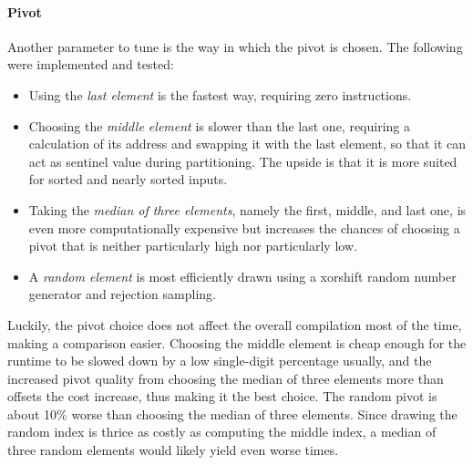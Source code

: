 \paragraph{Pivot}
Another parameter to tune is the way in which the pivot is chosen.
The following were implemented and tested:
\begin{itemize}
	\item
	Using the \emph{last element} is the fastest way, requiring zero instructions.

	\item
	Choosing the \emph{middle element} is slower than the last one, requiring a calculation of its address and swapping it with the last element, so that it can act as sentinel value during partitioning.
	The upside is that it is more suited for sorted and nearly sorted inputs.

	\item
	Taking the \emph{median of three elements}, namely the first, middle, and last one, is even more computationally expensive but increases the chances of choosing a pivot that is neither particularly high nor particularly low.

	\item
	A \emph{random element} is most efficiently drawn using a xorshift random number generator and rejection sampling.
\end{itemize}
Luckily, the pivot choice does not affect the overall compilation most of the time, making a comparison easier.
Choosing the middle element is cheap enough for the runtime to be slowed down by a low single-digit percentage usually, and the increased pivot quality from choosing the median of three elements more than offsets the cost increase, thus making it the best choice.
The random pivot is about 10\% worse than choosing the median of three elements.
Since drawing the random index is thrice as costly as computing the middle index, a median of three random elements would likely yield even worse times.
